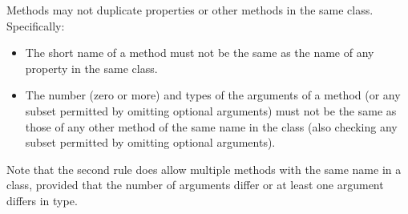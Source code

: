 Methods may not duplicate properties or other methods in the same class.
Specifically:
\begin{itemize}
\item 
The short name of a method must not be the same as the name of any
property in the same class.
\item 
The number (zero or more) and types of the arguments of a method (or any
subset permitted by omitting optional arguments) must not be the same as
those of any other method of the same name in the class (also checking
any subset permitted by omitting optional arguments).
\end{itemize}
Note that the second rule does allow multiple methods with the same
name in a class, provided that the number of arguments differ or
at least one argument differs in type.
\index{,}
